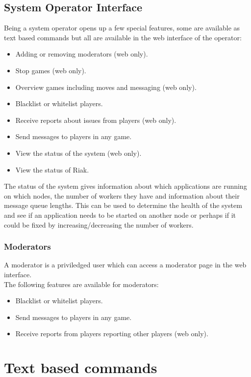 \documentclass[11pt,a4paper]{report}
\begin{document}
\section{System Operator Interface}
Being a system operator opens up a few special features, some are available as
text based commands but all are available in the web interface of the operator:
\begin{itemize}
\item Adding or removing moderators (web only).
\item Stop games (web only).
\item Overview games including moves and messaging (web only).
\item Blacklist or whitelist players.
\item Receive reports about issues from players (web only).
\item Send messages to players in any game.
\item View the status of the system (web only).
\item View the status of Riak.
\end{itemize}

The status of the system gives information about which applications are running
on which nodes, the number of workers they have and information about their
message queue lengths. This can be used to determine the health of the system
and see if an application needs to be started on another node or perhaps if it
could be fixed by increasing/decreasing the number of workers.

\subsection{Moderators}
A moderator is a priviledged user which can access a moderator page in the web
interface.\\

The following features are available for moderators:
\begin{itemize}
\item Blacklist or whitelist players.
\item Send messages to players in any game.
\item Receive reports from players reporting other players (web only).
\end{itemize}

\chapter{Text based commands}
\label{sec:textbasedcommands}
\end{document}
